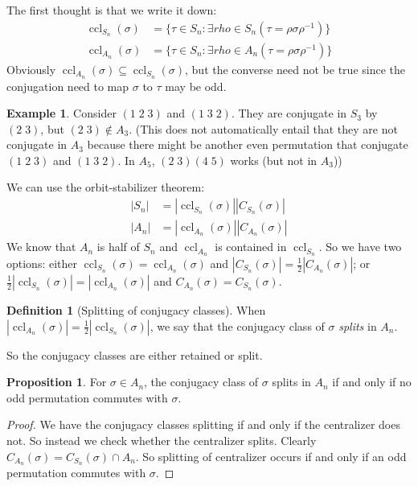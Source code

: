 \documentclass[a4paper]{article}
\theoremstyle{definition}
\newtheorem*{prop}{Proposition}
\newtheorem*{defi}{Definition}
\newtheorem*{eg}{Example}
\DeclareMathOperator\ccl{ccl}
\begin{document}
The first thought is that we write it down:
\begin{align*}
  \ccl_{S_n}(\sigma) &= \{\tau\in S_n: \exists rho \in S_n(\tau = \rho\sigma\rho^{-1})\}\\
  \ccl_{A_n}(\sigma) &= \{\tau\in S_n: \exists rho \in A_n(\tau = \rho\sigma\rho^{-1})\}
\end{align*}
Obviously $\ccl_{A_n}(\sigma)\subseteq \ccl_{S_n}(\sigma)$, but the converse need not be true since the conjugation need to map $\sigma$ to $\tau$ may be odd. 

\begin{eg}
  Consider $(1\; 2\; 3)$ and $(1\; 3\; 2)$. They are conjugate in $S_3$ by $(2\; 3)$, but $(2\; 3)\not\in A_3$. (This does not automatically entail that they are not conjugate in $A_3$ because there might be another even permutation that conjugate $(1\; 2\; 3)$ and $(1\; 3\; 2)$. In $A_5$, $(2\; 3)(4\; 5)$ works (but not in $A_3$))
\end{eg}

We can use the orbit-stabilizer theorem:
\begin{align*}
  |S_n| &= |\ccl_{S_n}(\sigma)||C_{S_n}(\sigma)|\\
  |A_n| &= |\ccl_{A_n}(\sigma)||C_{A_n}(\sigma)|
\end{align*}
We know that $A_n$ is half of $S_n$ and $\ccl_{A_n}$ is contained in $\ccl_{S_n}$. So we have two options: either $\ccl_{S_n}(\sigma) = \ccl_{A_n}(\sigma)$ and $|C_{S_n}(\sigma)| = \frac{1}{2}|C_{A_n}(\sigma)|$; or $\frac{1}{2}|\ccl_{S_n}(\sigma)| = |\ccl_{A_n}(\sigma)|$ and $C_{A_n}(\sigma) = C_{S_n}(\sigma)$.

\begin{defi}[Splitting of conjugacy classes]
  When $|\ccl_{A_n}(\sigma)| = \frac{1}{2}|\ccl_{S_n}(\sigma)|$, we say that the conjugacy class of $\sigma$ \emph{splits} in $A_n$. 
\end{defi}

So the conjugacy classes are either retained or split.

\begin{prop}
  For $\sigma\in A_n$, the conjugacy class of $\sigma$ splits in $A_n$ if and only if no odd permutation commutes with $\sigma$. 
\end{prop}

\begin{proof}
  We have the conjugacy classes splitting if and only if the centralizer does not. So instead we check whether the centralizer splits. Clearly $C_{A_n}(\sigma) = C_{S_n}(\sigma)\cap A_n$. So splitting of centralizer occurs if and only if an odd permutation commutes with $\sigma$.
\end{proof}
\end{document}
